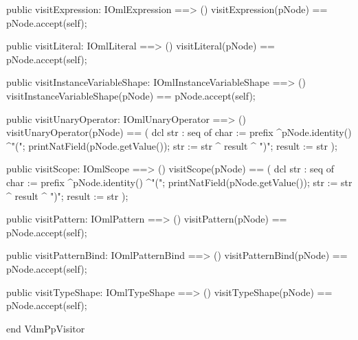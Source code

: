 \begin{vdm_al}
  public visitExpression: IOmlExpression ==> ()
  visitExpression(pNode) == pNode.accept(self);

  public visitLiteral: IOmlLiteral ==> ()
  visitLiteral(pNode) == pNode.accept(self);

  public visitInstanceVariableShape: IOmlInstanceVariableShape ==> ()
  visitInstanceVariableShape(pNode) == pNode.accept(self);

  public visitUnaryOperator: IOmlUnaryOperator ==> ()
  visitUnaryOperator(pNode) == 
    ( dcl str : seq of char := prefix ^pNode.identity() ^"(";
      printNatField(pNode.getValue());
      str := str ^ result ^ ")";
      result := str );

  public visitScope: IOmlScope ==> ()
  visitScope(pNode) == 
    ( dcl str : seq of char := prefix ^pNode.identity() ^"(";
      printNatField(pNode.getValue());
      str := str ^ result ^ ")";
      result := str );

  public visitPattern: IOmlPattern ==> ()
  visitPattern(pNode) == pNode.accept(self);

  public visitPatternBind: IOmlPatternBind ==> ()
  visitPatternBind(pNode) == pNode.accept(self);

  public visitTypeShape: IOmlTypeShape ==> ()
  visitTypeShape(pNode) == pNode.accept(self);

end VdmPpVisitor
\end{vdm_al}
